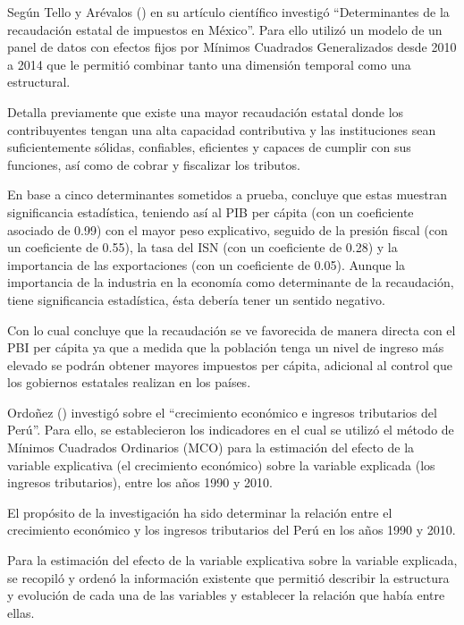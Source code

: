 \documentclass[
  jou,
  floatsintext,
  longtable,
  a4paper,
  nolmodern,
  notxfonts,
  notimes,
  12pt,
  colorlinks=true,linkcolor=blue,citecolor=blue,urlcolor=blue]{apa7}
\begin{document}
Según Tello y Arévalos ()
en su artículo científico investigó ``Determinantes de la recaudación
estatal de impuestos en México''. Para ello utilizó un modelo de un
panel de datos con efectos fijos por Mínimos Cuadrados Generalizados
desde 2010 a 2014 que le permitió combinar tanto una dimensión temporal
como una estructural.

Detalla previamente que existe una mayor recaudación estatal donde los
contribuyentes tengan una alta capacidad contributiva y las
instituciones sean suficientemente sólidas, confiables, eficientes y
capaces de cumplir con sus funciones, así como de cobrar y fiscalizar
los tributos.

En base a cinco determinantes sometidos a prueba, concluye que estas
muestran significancia estadística, teniendo así al PIB per cápita (con
un coeficiente asociado de 0.99) con el mayor peso explicativo, seguido
de la presión fiscal (con un coeficiente de 0.55), la tasa del ISN (con
un coeficiente de 0.28) y la importancia de las exportaciones (con un
coeficiente de 0.05). Aunque la importancia de la industria en la
economía como determinante de la recaudación, tiene significancia
estadística, ésta debería tener un sentido negativo.

Con lo cual concluye que la recaudación se ve favorecida de manera
directa con el PBI per cápita ya que a medida que la población tenga un
nivel de ingreso más elevado se podrán obtener mayores impuestos per
cápita, adicional al control que los gobiernos estatales realizan en los
países.

Ordoñez () investigó sobre
el ``crecimiento económico e ingresos tributarios del Perú''. Para ello,
se establecieron los indicadores en el cual se utilizó el método de
Mínimos Cuadrados Ordinarios (MCO) para la estimación del efecto de la
variable explicativa (el crecimiento económico) sobre la variable
explicada (los ingresos tributarios), entre los años 1990 y 2010.

El propósito de la investigación ha sido determinar la relación entre el
crecimiento económico y los ingresos tributarios del Perú en los años
1990 y 2010.

Para la estimación del efecto de la variable explicativa sobre la
variable explicada, se recopiló y ordenó la información existente que
permitió describir la estructura y evolución de cada una de las
variables y establecer la relación que había entre ellas.
\end{document}
